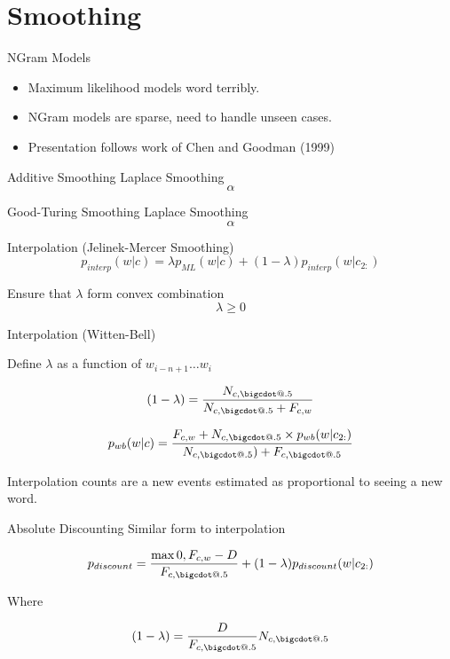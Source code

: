 \documentclass{beamer}
\makeatletter
\newcommand*\bigcdot{\mathpalette\bigcdot@{.5}}
\newcommand*\bigcdot@[2]{\mathbin{\vcenter{\hbox{\scalebox{#2}{$\m@th#1\bullet$}}}}}
\makeatother
\begin{document}
\section{Smoothing}

\begin{frame}{NGram Models}
  \begin{itemize}
  \item Maximum likelihood models word terribly.
    \air 

  \item NGram models are  sparse, need to handle unseen cases.

    \air
    

  \item Presentation follows work of Chen and Goodman (1999)
  \end{itemize}
\end{frame}

\begin{frame}{Additive Smoothing}
  Laplace Smoothing
  \[\alpha \]
\end{frame}

\begin{frame}{Good-Turing Smoothing}
  Laplace Smoothing
  \[\alpha \]
\end{frame}


\begin{frame}{Interpolation (Jelinek-Mercer Smoothing)}
  \[ p_{interp}(w |  c) =  \lambda p_{ML}(w |  c) + (1 - \lambda) p_{interp}(w | c_{2:}) \]

  Ensure that $\lambda$ form convex combination
  \[\lambda \geq 0\]

\end{frame}


\begin{frame}{Interpolation (Witten-Bell)}

  Define $\lambda$ as a function of $w_{i-n+1} \ldots w_i$

  \[(1 - \lambda) =  \frac{\displaystyle N_{c, \bigcdot}} {\displaystyle N_{c, \bigcdot} + F_{c, w}}\]


  \[ p_{wb}(w | c) = \frac{\displaystyle F_{c, w} + N_{c, \bigcdot} \times p_{wb}(w| c_{2:})} {\displaystyle N_{c, \bigcdot}) + F_{c, \bigcdot}} \]

    Interpolation counts are a new events estimated as proportional to seeing a new word.
\end{frame}

\begin{frame}{Absolute Discounting}
  Similar form to interpolation

  \[ p_{discount} =\frac{\max{0, F_{c,w} - D}}{F_{c, \bigcdot}} +  (1 - \lambda) p_{discount}(w |  c_{2:} )  \]

  Where

  \[(1-\lambda) = \frac{D}{F_{c, \bigcdot}} N_{c,\bigcdot} \]
\end{frame}
\end{document}
